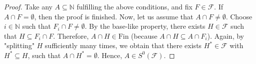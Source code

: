 \documentclass{amsart}
\theoremstyle{definition}
\newtheorem{remark}[thm]{Remark}
\theoremstyle{definition}
\newcommand{\N}{{\mathbb N}}
\newcommand{\Fin}{\textrm{Fin}}
\newcommand{\calK}{\mathcal{K}}
\newcommand{\MB}{S^0}  %
\begin{document}
\begin{proof}
Take any $A\subseteq\N$ fulfilling the above conditions, and fix $F\in\mathcal{F}$. If $A\cap F=\emptyset$, then the proof is finished. Now, let us assume that $A\cap F \neq\emptyset$. Choose $i\in\N$ such that $F_i\cap F \neq\emptyset$. By the base-like property,
there exists $H\in\mathcal{F}$ such that $H\subseteq F_i\cap F$. Therefore, $A\cap H\in\Fin$ 
(because $A\cap H\subseteq A\cap F_i$). Again, by "splitting" $H$ sufficiently many times, we obtain that there exists $H^*\in\mathcal{F}$ with $H^*\subseteq H$, such that $A\cap H^* =\emptyset$. Hence, $A\in\MB(\mathcal{F})$.
\end{proof}

%
\end{document}
